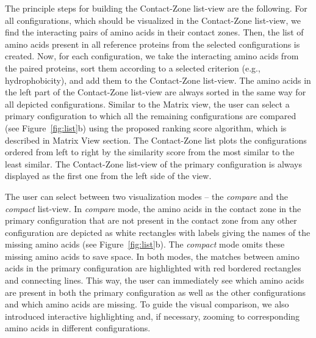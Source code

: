 \documentclass[twocolumn]{bmcart}%
\def\MatView {Matrix view\xspace}
\def\CoZoListView {Contact-Zone list-view\xspace}
\def\CoZoList{Contact-Zone list\xspace}
\begin{document}
The principle steps for building the \CoZoListView are the following.
For all configurations, which should be visualized in the \CoZoListView, we find the interacting pairs of amino acids in their contact zones.
Then, the list of amino acids present in all reference proteins from the selected configurations is created.
Now, for each configuration, we take the interacting amino acids from the paired proteins, sort them according to a selected criterion (e.g., hydrophobicity), and add them to the \CoZoListView.
The amino acids in the left part of the \CoZoListView are always sorted in the same way for all depicted configurations.
Similar to the \MatView, the user can select a primary configuration to which all the remaining configurations are compared (see Figure~\ref{fig:list}b) using the proposed ranking score algorithm, which is described in Matrix View section.
The \CoZoList plots the configurations ordered from left to right by the similarity score from the most similar to the least similar.
The \CoZoListView of the primary configuration is always displayed as the first one from the left side of the view.

The user can select between two visualization modes -- the \textit{compare} and the \textit{compact} list-view.
In \textit{compare} mode, the amino acids in the contact zone in the primary configuration that are not present in the contact zone from any other configuration are depicted as white rectangles with labels giving the names of the missing amino acids (see Figure~\ref{fig:list}b).
The \textit{compact} mode omits these missing amino acids to save space.
In both modes, the matches between amino acids in the primary configuration are highlighted with red bordered rectangles and connecting lines.
This way, the user can immediately see which amino acids are present in both the primary configuration as well as the other configurations and which amino acids are missing.
To guide the visual comparison, we also introduced interactive highlighting and, if necessary, zooming to corresponding amino acids in different configurations.
\end{document}
